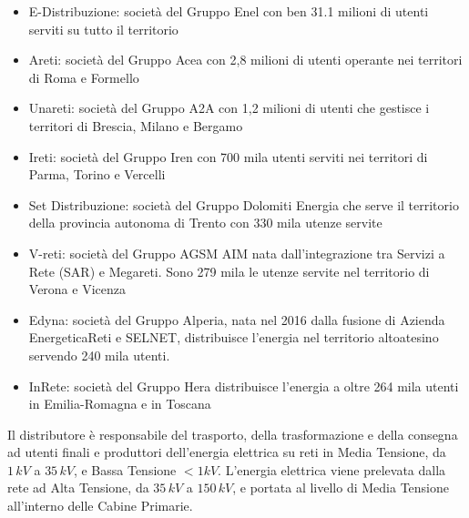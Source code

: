 \begin{itemize}
    
    \item E-Distribuzione: società del Gruppo Enel con ben 31.1 milioni di utenti serviti \cite{Clienti-sertivi-distribuzione} su tutto il territorio
    
    \item Areti: società del Gruppo Acea con 2,8 milioni di utenti operante nei territori di Roma e Formello \cite{Clienti-sertivi-areti}
    
    \item Unareti: società del Gruppo A2A con 1,2 milioni di utenti che gestisce i territori di Brescia, Milano e Bergamo \cite{Clienti-sertivi-uniareti}
    
    \item Ireti: società del Gruppo Iren con  700 mila utenti serviti nei territori di Parma, Torino e Vercelli \cite{Clienti-sertivi-ireti}
    
    \item Set Distribuzione: società del Gruppo Dolomiti Energia che serve il territorio della provincia autonoma di Trento con 330 mila utenze servite \cite{Clienti-sertivi-SetDistribuzione}
    
    \item V-reti: società del Gruppo AGSM AIM nata dall'integrazione tra Servizi a Rete (SAR) e Megareti. Sono 279 mila le utenze servite nel territorio di Verona e Vicenza  \cite{Clienti-sertivi-v-reti}
    
    \item Edyna: società del Gruppo Alperia, nata nel 2016 dalla fusione di Azienda EnergeticaReti e SELNET, distribuisce l'energia nel territorio altoatesino servendo 240 mila utenti.\cite{Clienti-sertivi-edyna}
    
    \item InRete: società del Gruppo Hera distribuisce l'energia a oltre 264 mila utenti in Emilia-Romagna e in Toscana  \cite{Clienti-sertivi-edyna}

    
\end{itemize}


Il distributore è responsabile del trasporto, della trasformazione e della consegna ad utenti finali e produttori dell'energia elettrica su reti in Media Tensione, da $1\,kV$ a $35\,kV$, e Bassa Tensione $<1kV$.
L'energia elettrica viene prelevata dalla rete ad Alta Tensione, da $35\,kV$ a $150\,kV$, e portata al livello di Media Tensione  all'interno delle Cabine Primarie.


